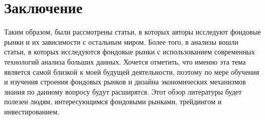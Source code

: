 \documentclass[14pt]{extarticle}
\begin{document}
\section{Заключение}

Таким образом, были рассмотрены статьи, в которых авторы исследуют фондовые рынки и их зависимости с остальным миром. Более того, в анализы вошли статьи, в которых исследуются фондовые рынки с использованием современных технологий анализа больших данных. Хочется отметить, что именно эта тема является самой близкой к моей будущей деятельности, поэтому по мере обучения и изучения строения фондовых рынков и дизайна экономических механизмов знания по данному вопросу будут расширятся. Этот обзор литературы будет полезен людям, интересующимся фондовыми рынками, трейдингом и инвестированием.


\end{document}
